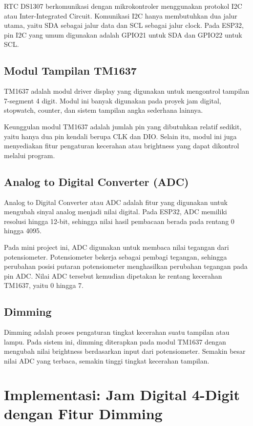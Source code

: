 \documentclass[12pt,a4paper]{article}
\begin{document}
RTC DS1307 berkomunikasi dengan mikrokontroler menggunakan protokol I2C atau Inter-Integrated Circuit. Komunikasi I2C hanya membutuhkan dua jalur utama, yaitu SDA sebagai jalur data dan SCL sebagai jalur clock. Pada ESP32, pin I2C yang umum digunakan adalah GPIO21 untuk SDA dan GPIO22 untuk SCL.

\subsection{Modul Tampilan TM1637}
TM1637 adalah modul driver display yang digunakan untuk mengontrol tampilan 7-segment 4 digit. Modul ini banyak digunakan pada proyek jam digital, stopwatch, counter, dan sistem tampilan angka sederhana lainnya.

Keunggulan modul TM1637 adalah jumlah pin yang dibutuhkan relatif sedikit, yaitu hanya dua pin kendali berupa CLK dan DIO. Selain itu, modul ini juga menyediakan fitur pengaturan kecerahan atau brightness yang dapat dikontrol melalui program.

\subsection{Analog to Digital Converter (ADC)}
Analog to Digital Converter atau ADC adalah fitur yang digunakan untuk mengubah sinyal analog menjadi nilai digital. Pada ESP32, ADC memiliki resolusi hingga 12-bit, sehingga nilai hasil pembacaan berada pada rentang 0 hingga 4095.

Pada mini project ini, ADC digunakan untuk membaca nilai tegangan dari potensiometer. Potensiometer bekerja sebagai pembagi tegangan, sehingga perubahan posisi putaran potensiometer menghasilkan perubahan tegangan pada pin ADC. Nilai ADC tersebut kemudian dipetakan ke rentang kecerahan TM1637, yaitu 0 hingga 7.

\subsection{Dimming}
Dimming adalah proses pengaturan tingkat kecerahan suatu tampilan atau lampu. Pada sistem ini, dimming diterapkan pada modul TM1637 dengan mengubah nilai brightness berdasarkan input dari potensiometer. Semakin besar nilai ADC yang terbaca, semakin tinggi tingkat kecerahan tampilan.

\section{Implementasi: Jam Digital 4-Digit dengan Fitur Dimming}
\end{document}
